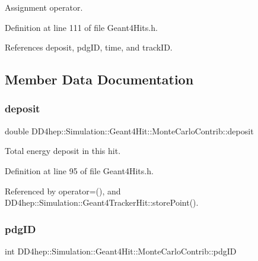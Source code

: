Assignment operator. 



Definition at line 111 of file Geant4\+Hits.\+h.



References deposit, pdg\+ID, time, and track\+ID.



\subsection{Member Data Documentation}
\hypertarget{struct_d_d4hep_1_1_simulation_1_1_geant4_hit_1_1_monte_carlo_contrib_a3bbe67139ddec239f5dc33ace2986bb1}{}\label{struct_d_d4hep_1_1_simulation_1_1_geant4_hit_1_1_monte_carlo_contrib_a3bbe67139ddec239f5dc33ace2986bb1} 
\subsubsection{\texorpdfstring{deposit}{deposit}}
{\footnotesize\ttfamily double D\+D4hep\+::\+Simulation\+::\+Geant4\+Hit\+::\+Monte\+Carlo\+Contrib\+::deposit}



Total energy deposit in this hit. 



Definition at line 95 of file Geant4\+Hits.\+h.



Referenced by operator=(), and D\+D4hep\+::\+Simulation\+::\+Geant4\+Tracker\+Hit\+::store\+Point().

\hypertarget{struct_d_d4hep_1_1_simulation_1_1_geant4_hit_1_1_monte_carlo_contrib_aa0b40f39fd3df147934c6a2d609e72c1}{}\label{struct_d_d4hep_1_1_simulation_1_1_geant4_hit_1_1_monte_carlo_contrib_aa0b40f39fd3df147934c6a2d609e72c1} 
\subsubsection{\texorpdfstring{pdg\+ID}{pdgID}}
{\footnotesize\ttfamily int D\+D4hep\+::\+Simulation\+::\+Geant4\+Hit\+::\+Monte\+Carlo\+Contrib\+::pdg\+ID}



